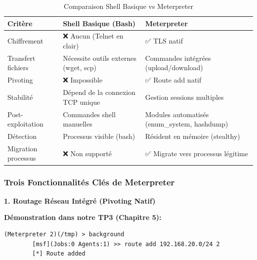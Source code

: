 \documentclass[12pt,a4paper,openany]{report}
\newcommand{\tableheadcolor}{\rowcolor{tableheadbg}}
\begin{document}
	\begin{table}[H]
		\centering
		\small
		\renewcommand{\arraystretch}{1.5}
		\setlength{\arrayrulewidth}{0.5pt}
		\begin{tabular}{p{4cm} p{5cm} p{4.5cm}}
			\arrayrulecolor{tableborder}
			\hline
			\tableheadcolor
			\textcolor{tableheadfg}{\textbf{Critère}} &
			\textcolor{tableheadfg}{\textbf{Shell Basique (Bash)}} &
			\textcolor{tableheadfg}{\textbf{Meterpreter}} \\
			\hline
			\rowcolor{tablerowalt}
			Chiffrement & 
			❌ Aucun (Telnet en clair) & 
			✅ TLS natif \\
			
			Transfert fichiers & 
			Nécessite outils externes (wget, scp) & 
			Commandes intégrées (upload/download) \\
			
			\rowcolor{tablerowalt}
			Pivoting & 
			❌ Impossible & 
			✅ Route add natif \\
			
			Stabilité & 
			Dépend de la connexion TCP unique & 
			Gestion sessions multiples \\
			
			\rowcolor{tablerowalt}
			Post-exploitation & 
			Commandes shell manuelles & 
			Modules automatisés (enum\_system, hashdump) \\
			
			Détection & 
			Processus visible (bash) & 
			Résident en mémoire (stealthy) \\
			
			\rowcolor{tablerowalt}
			Migration processus & 
			❌ Non supporté & 
			✅ Migrate vers processus légitime \\
			\hline
		\end{tabular}
		\caption{Comparaison Shell Basique vs Meterpreter}
	\end{table}
	
	\subsubsection{Trois Fonctionnalités Clés de Meterpreter}
	
	\textbf{1. Routage Réseau Intégré (Pivoting Natif)}
	
	\textbf{Démonstration dans notre TP3 (Chapitre 5):}
	
	\begin{lstlisting}[caption=Configuration Route via Meterpreter]
		(Meterpreter 2)(/tmp) > background
		[msf](Jobs:0 Agents:1) >> route add 192.168.20.0/24 2
		[*] Route added
	\end{lstlisting}
	
\end{document}
